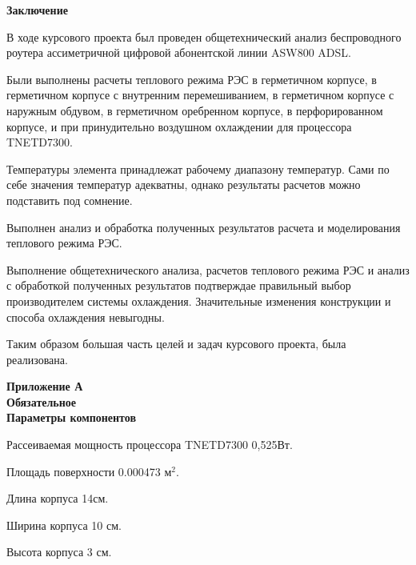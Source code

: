 \begin{center}
\textbf{Заключение}
\end{center}

  В ходе курсового проекта был проведен общетехнический анализ
  беспроводного роутера ассиметричной цифровой абонентской линии
  ASW800 ADSL.

  Были выполнены расчеты теплового режима РЭС в
  герметичном корпусе,
  в герметичном корпусе с внутренним перемешиванием,
  в герметичном корпусе с наружным обдувом,
  в герметичном оребренном корпусе,
  в перфорированном корпусе,
  и при принудительно воздушном охлаждении
  для процессора TNETD7300.

  Температуры элемента принадлежат рабочему диапазону
  температур. Сами по себе значения температур
  адекватны, однако результаты расчетов можно подставить под сомнение.

  Выполнен анализ и обработка полученных результатов расчета и
  моделирования теплового режима РЭС.

  Выполнение общетехнического анализа, расчетов теплового
  режима РЭС и анализ с обработкой полученных результатов
  подтверждае правильный выбор производителем системы охлаждения.
  Значительные изменения конструкции и способа охлаждения невыгодны.

  Таким образом большая часть целей и задач курсового проекта,
  была реализована.

  \newpage



\renewcommand{\refname}{\textbf{Cписок использованных источников}}
\printbibliography

\newpage
\begin{center}
\textbf{Приложение А}\\
\textbf{Обязательное}\\
\textbf{Параметры компонентов}
\end{center}

Рассеиваемая мощность процессора TNETD7300 0,525Вт.

Площадь поверхности 0.000473 $\mathrm{м^2}$.


Длина корпуса 14см.

Ширина корпуса 10 см.

Высота корпуса 3 см.
\newpage


